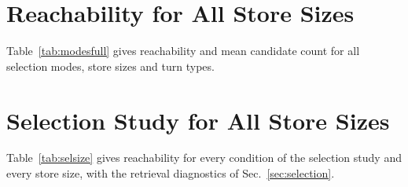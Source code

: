 \IfFileExists{IEEEtran.cls}{\documentclass[journal]{IEEEtran}\def\HAVEIEEE{1}}{\documentclass[10pt,twocolumn]{article}\usepackage[margin=0.7in,columnsep=0.25in]{geometry}}
\begin{document}
\begin{table}[!ht]
\centering\footnotesize\renewcommand{\arraystretch}{0.85}
\caption{Ablation, auto-apply policy: error-rate cells (60 paired persona runs each). * : uncorrected $p<0.05$.}
\label{tab:appauto}
\end{table}

\FloatBarrier
\section{Reachability for All Store Sizes}
Table~\ref{tab:modesfull} gives reachability and mean candidate count for all selection modes, store sizes and turn types.

\begin{table}[!ht]
\centering\footnotesize\renewcommand{\arraystretch}{0.85}
\caption{Reachability (mean number of candidates) by mode, store size $N$ and turn type.}
\label{tab:modesfull}
\end{table}

\FloatBarrier
\section{Selection Study for All Store Sizes}
Table~\ref{tab:selsize} gives reachability for every condition of the selection study and every store size, with the retrieval diagnostics of Sec.~\ref{sec:selection}.

\begin{table}[!ht]
\centering\footnotesize\renewcommand{\arraystretch}{0.85}
\caption{Selection study: reachability by condition and store size $N$, and diagnostics (\selEventsTotal\ change events per store size).}
\label{tab:selsize}
\end{table}

\FloatBarrier
\end{document}
